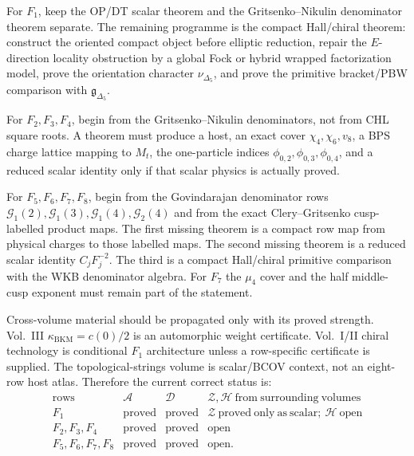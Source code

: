 For \(F_1\), keep the OP/DT scalar theorem and the
Gritsenko--Nikulin denominator theorem separate.  The remaining
programme is the compact Hall/chiral theorem: construct the oriented
compact object before elliptic reduction, repair the \(E\)-direction
locality obstruction by a global Fock or hybrid wrapped
factorization model, prove the orientation character
\(\nu_{\Delta_5}\), and prove the primitive bracket/PBW comparison
with \(\mathfrak g_{\Delta_5}\).

For \(F_2,F_3,F_4\), begin from the Gritsenko--Nikulin denominators,
not from CHL square roots.  A theorem must produce a host, an exact
cover \(\chi_4,\chi_6,v_8\), a BPS charge lattice mapping to \(M_t\),
the one-particle indices \(\phi_{0,2},\phi_{0,3},\phi_{0,4}\), and a
reduced scalar identity only if that scalar physics is actually proved.

For \(F_5,F_6,F_7,F_8\), begin from the Govindarajan denominator rows
\(\mathcal G_1(2),\mathcal G_1(3),\mathcal G_1(4),\mathcal G_2(4)\)
and from the exact Clery--Gritsenko cusp-labelled product maps.  The
first missing theorem is a compact row map from physical charges to
those labelled maps.  The second missing theorem is a reduced scalar
identity \(C_jF_j^{-2}\).  The third is a compact Hall/chiral primitive
comparison with the WKB denominator algebra.  For \(F_7\) the \(\mu_4\)
cover and the half middle-cusp exponent must remain part of the
statement.

Cross-volume material should be propagated only with its proved
strength.  Vol.~III \(\kappa_{\mathrm{BKM}}=c(0)/2\) is an
automorphic weight certificate.  Vol.~I/II chiral technology is
conditional \(F_1\) architecture unless a row-specific certificate is
supplied.  The topological-strings volume is scalar/BCOV context, not
an eight-row host atlas.  Therefore the current correct status is:
\[
\begin{array}{c|c|c|c}
\mathrm{rows}&\mathscr A&\mathscr D&
\mathscr Z,\mathscr H\ \mathrm{from\ surrounding\ volumes}\\ \hline
F_1&\mathrm{proved}&\mathrm{proved}&
\mathscr Z\ \mathrm{proved\ only\ as\ scalar;\ }\mathscr H\ \mathrm{open}\\
F_2,F_3,F_4&\mathrm{proved}&\mathrm{proved}&\mathrm{open}\\
F_5,F_6,F_7,F_8&\mathrm{proved}&\mathrm{proved}&\mathrm{open}.
\end{array}
\]
